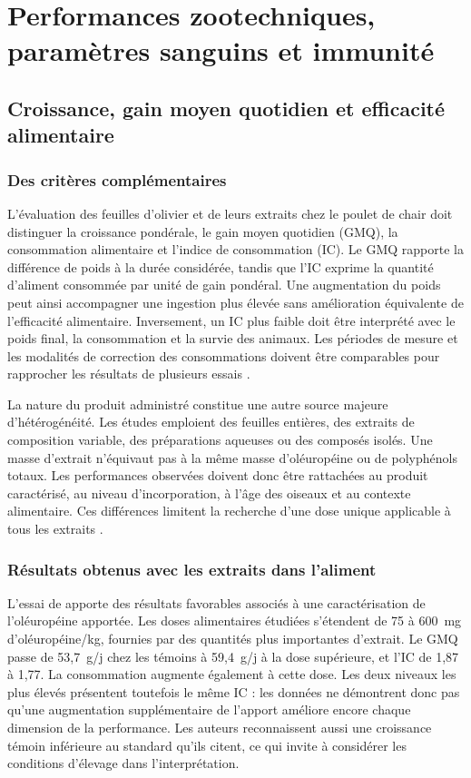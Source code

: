﻿\section{Performances zootechniques, paramètres sanguins et immunité}
\label{chap:performances}

\subsection{Croissance, gain moyen quotidien et efficacité alimentaire}

\subsubsection{Des critères complémentaires}

L'évaluation des feuilles d'olivier et de leurs extraits chez le poulet de chair doit distinguer la croissance pondérale, le gain moyen quotidien (GMQ), la consommation alimentaire et l'indice de consommation (IC). Le GMQ rapporte la différence de poids à la durée considérée, tandis que l'IC exprime la quantité d'aliment consommée par unité de gain pondéral. Une augmentation du poids peut ainsi accompagner une ingestion plus élevée sans amélioration équivalente de l'efficacité alimentaire. Inversement, un IC plus faible doit être interprété avec le poids final, la consommation et la survie des animaux. Les périodes de mesure et les modalités de correction des consommations doivent être comparables pour rapprocher les résultats de plusieurs essais \citep{Erener2020,Mahasneh2024}.

La nature du produit administré constitue une autre source majeure d'hétérogénéité. Les études emploient des feuilles entières, des extraits de composition variable, des préparations aqueuses ou des composés isolés. Une masse d'extrait n'équivaut pas à la même masse d'oléuropéine ou de polyphénols totaux. Les performances observées doivent donc être rattachées au produit caractérisé, au niveau d'incorporation, à l'âge des oiseaux et au contexte alimentaire. Ces différences limitent la recherche d'une dose unique applicable à tous les extraits \citep{Erener2020,Pirman2021,Alfifi2025}.

\subsubsection{Résultats obtenus avec les extraits dans l'aliment}

L'essai de \citet{Erener2020} apporte des résultats favorables associés à une caractérisation de l'oléuropéine apportée. Les doses alimentaires étudiées s'étendent de 75 à 600~mg d'oléuropéine/kg, fournies par des quantités plus importantes d'extrait. Le GMQ passe de 53,7~g/j chez les témoins à 59,4~g/j à la dose supérieure, et l'IC de 1,87 à 1,77. La consommation augmente également à cette dose. Les deux niveaux les plus élevés présentent toutefois le même IC : les données ne démontrent donc pas qu'une augmentation supplémentaire de l'apport améliore encore chaque dimension de la performance. Les auteurs reconnaissent aussi une croissance témoin inférieure au standard qu'ils citent, ce qui invite à considérer les conditions d'élevage dans l'interprétation.

